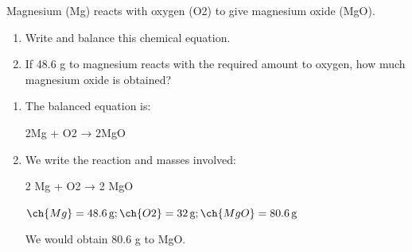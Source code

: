 \begin{exercise}
    Magnesium (Mg) reacts with oxygen (O2) to give magnesium oxide (MgO).
    \begin{enumerate}[label=\letraminuscula]
        \item Write and balance this chemical equation.
        \item If 48.6 g to magnesium reacts with the
        required amount to oxygen, how much
        magnesium oxide is obtained?
    \end{enumerate}
    \begin{solu}
        \begin{enumerate}[label=\letraminuscula]
            \item The balanced equation is:
            \begin{reaction*}
                2Mg + O2 → 2MgO
            \end{reaction*}
            \item We write the reaction and masses involved:
            \begin{reaction*}
                2 Mg + O2 → 2 MgO
            \end{reaction*}
            \( \ch{Mg} = \qty{48.6}{\g}; \ch{O2} = \qty{32}{\g}; \ch{MgO} = \qty{80.6}{\g} \)

            We would obtain 80.6 g to MgO.
        \end{enumerate}
    \end{solu}
\end{exercise}


